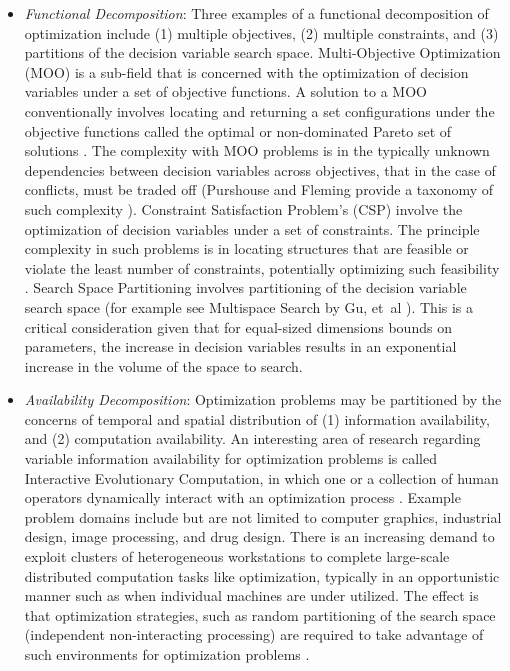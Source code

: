 \documentclass[a4paper, 11pt]{article}
\begin{document}
\begin{itemize}
	\item \emph{Functional Decomposition}: Three examples of a functional decomposition of optimization include (1) multiple objectives, (2) multiple constraints, and (3) partitions of the decision variable search space. Multi-Objective Optimization (MOO) is a sub-field that is concerned with the optimization of decision variables under a set of objective functions. A solution to a MOO conventionally involves locating and returning a set configurations under the objective functions called the optimal or non-dominated Pareto set of solutions \cite{Deb2001}. The complexity with MOO problems is in the typically unknown dependencies between decision variables across objectives, that in the case of conflicts, must be traded off (Purshouse and Fleming provide a taxonomy of such complexity \cite{Purshouse2003}). Constraint Satisfaction Problem's (CSP) involve the optimization of decision variables under a set of constraints. The principle complexity in such problems is in locating structures that are feasible or violate the least number of constraints, potentially optimizing such feasibility \cite{Tsang1993, Kumar1992}. Search Space Partitioning involves partitioning of the decision variable search space (for example see Multispace Search by Gu, et~al \cite{Du1997, Gu1997, Gu1994}). This is a critical consideration given that for equal-sized dimensions bounds on parameters, the increase in decision variables results in an exponential increase in the volume of the space to search.
			
	\item \emph{Availability Decomposition}: Optimization problems may be partitioned by the concerns of temporal and spatial distribution of (1) information availability, and (2) computation availability. An interesting area of research regarding variable information availability for optimization problems is called Interactive Evolutionary Computation, in which one or a collection of human operators dynamically interact with an optimization process \cite{Takagi2001}. Example problem domains include but are not limited to computer graphics, industrial design, image processing, and drug design. There is an increasing demand to exploit clusters of heterogeneous workstations to complete large-scale distributed computation tasks like optimization, typically in an opportunistic manner such as when individual machines are under utilized. The effect is that optimization strategies, such as random partitioning of the search space (independent non-interacting processing) are required to take advantage of such environments for optimization problems \cite{Schnekenburger1993, Liu2000}.
	

\end{itemize}
\end{document}
